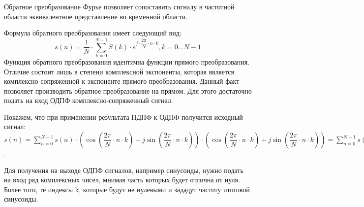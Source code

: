 Обратное преобразование Фурье позволяет сопоставить сигналу в частотной области эквивалентное представление во временной области.

Формула обратного преобразования имеет следующий вид:
\begin{equation}
s(n) = \dfrac{1}{N}\cdot \sum_{k=0}^{N-1} S(k) \cdot e^{j \cdot \dfrac{2\pi}{N} \cdot n \cdot k}, k = 0 \dots N-1
\end{equation}
Функция обратного преобразования идентична функции прямого преобразования. Отличие состоит лишь в
степени комплексной экспоненты, которая является комплексно сопряженной к экспоненте прямого
преобразования. Данный факт позволяет производить обратное преобразование на прямом. Для этого
достаточно подать на вход ОДПФ комплексно-сопряженный сигнал.

Покажем, что при применении результата ПДПФ к ОДПФ получится исходный сигнал:\newline
\(s(n) = \sum_{n = 0}^{N -1} s(n) \cdot (\cos(\dfrac{2\pi}{N} \cdot n \cdot k) - j \sin(\dfrac{2\pi}{N}
\cdot n \cdot k)) \cdot (\cos(\dfrac{2\pi}{N} \cdot n \cdot k) + j \sin(\dfrac{2\pi}{N} \cdot n \cdot
k)) = \sum_{n = 0}^{N -1} s(n) \cdot \cos^2(\dfrac{2\pi}{N} \cdot n \cdot k) - j^2 \cdot
\sin^2(\dfrac{2\pi}{N} \cdot n \cdot k)) = \sum_{n = 0}^{N -1} s(n) \cdot 1\).

Для получения на выходе ОДПФ сигналов, например синусоиды, нужно подать на вход ряд
комплексных чисел, мнимая часть которых будет отлична от нуля. Более того, те индексы k, которые будут
не нулевыми и зададут частоту итоговой синусоиды.

\lstset{language=Matlab,
        basicstyle=\small}


\newpage